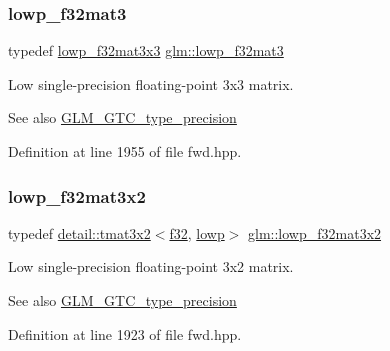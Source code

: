 \subsubsection{\texorpdfstring{lowp\+\_\+f32mat3}{lowp\_f32mat3}}
{\footnotesize\ttfamily typedef \hyperlink{group__gtc__type__precision_ga92f4b130a9651c69361600272f113542}{lowp\+\_\+f32mat3x3} \hyperlink{group__gtc__type__precision_ga84500ab23c0f0f3c585f8ad02f33b88c}{glm\+::lowp\+\_\+f32mat3}}

Low single-\/precision floating-\/point 3x3 matrix. \begin{DoxySeeAlso}{See also}
\hyperlink{group__gtc__type__precision}{G\+L\+M\+\_\+\+G\+T\+C\+\_\+type\+\_\+precision} 
\end{DoxySeeAlso}


Definition at line 1955 of file fwd.\+hpp.

\mbox{\label{group__gtc__type__precision_gadf8ee4630e8d2b6ae72293a7c8dff497}} 
\subsubsection{\texorpdfstring{lowp\+\_\+f32mat3x2}{lowp\_f32mat3x2}}
{\footnotesize\ttfamily typedef \hyperlink{structglm_1_1detail_1_1tmat3x2}{detail\+::tmat3x2}$<$\hyperlink{group__gtc__type__precision_ga0ec999b57f5330d9021256e96038df04}{f32}, \hyperlink{namespaceglm_a0f04f086094c747d227af4425893f545ae161af3fc695e696ce3bf69f7332bc2d}{lowp}$>$ \hyperlink{group__gtc__type__precision_gadf8ee4630e8d2b6ae72293a7c8dff497}{glm\+::lowp\+\_\+f32mat3x2}}

Low single-\/precision floating-\/point 3x2 matrix. \begin{DoxySeeAlso}{See also}
\hyperlink{group__gtc__type__precision}{G\+L\+M\+\_\+\+G\+T\+C\+\_\+type\+\_\+precision} 
\end{DoxySeeAlso}


Definition at line 1923 of file fwd.\+hpp.

\mbox{\label{group__gtc__type__precision_ga92f4b130a9651c69361600272f113542}} 
